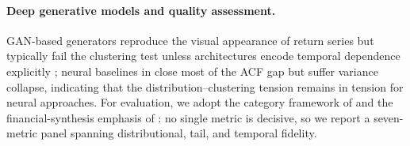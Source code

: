 \paragraph{Deep generative models and quality assessment.}
GAN-based generators reproduce the visual appearance of return series but typically fail the clustering test unless architectures encode temporal dependence explicitly \cite{takahashi2019modeling, kwon2024can}; neural baselines in \citet{alswaidan2026hybrid} close most of the ACF gap but suffer variance collapse, indicating that the distribution--clustering tension remains in tension for neural approaches.
For evaluation, we adopt the category framework of \citet{stenger2024thinking} and the financial-synthesis emphasis of \citet{assefa2020generating}: no single metric is decisive, so we report a seven-metric panel spanning distributional, tail, and temporal fidelity.
